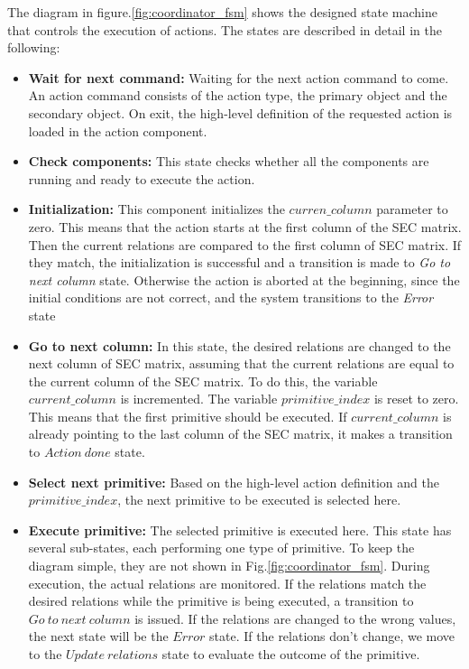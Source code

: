 The diagram in figure.\ref{fig:coordinator_fsm} shows the designed state machine that controls the execution of actions.
The states are described in detail in the following:
\begin{itemize}
 \item \textbf{Wait for next command:} Waiting for the next action command to come.
 An action command consists of the action type, the primary object and the secondary object.
 On exit, the high-level definition of the requested action is loaded in the action component.
 \item \textbf{Check components:} This state checks whether all the components are running and ready to execute the action. 
 \item \textbf{Initialization:} This component initializes the $curren\_column$ parameter to zero.
 This means that the action starts at the first column of the SEC matrix.
 Then the current relations are compared to the first column of SEC matrix.
 If they match, the initialization is successful and a transition is made to \textit{Go to next column} state.
 Otherwise the action is aborted at the beginning, since the initial conditions are not correct, and the system transitions to the \textit{Error} state
 \item \textbf{Go to next column:} In this state, the desired relations are changed to the next column of SEC matrix,
 assuming that the current relations are equal to the current column of the SEC matrix.
 To do this, the variable $current\_column$ is incremented.
 The variable $primitive\_index$ is reset to zero. This means that the first primitive should be executed.
 If $current\_column$ is already pointing to the last column of the SEC matrix, it makes a transition to $Action\ done$ state.
 \item \textbf{Select next primitive:} Based on the high-level action definition and the $primitive\_index$,
 the next primitive to be executed is selected here.
 \item \textbf{Execute primitive:} The selected primitive is executed here.
 This state has several sub-states, each performing one type of primitive.
 To keep the diagram simple, they are not shown in Fig.\ref{fig:coordinator_fsm}.
 During execution, the actual relations are monitored.
 If the relations match the desired relations while the primitive is being executed, a transition to $Go\ to\ next\ column$ is issued.
 If the relations are changed to the wrong values, the next state will be the $Error$ state.
 If the relations don't change, we move to the $Update\ relations$ state to evaluate the outcome of the primitive.
 

\end{itemize}
